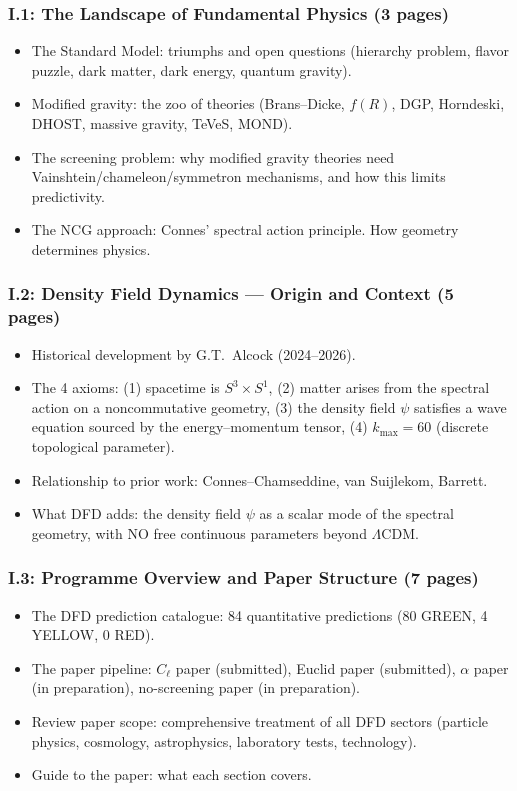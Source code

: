 \documentclass[11pt,a4paper]{article}
\begin{document}
\subsubsection{I.1: The Landscape of Fundamental Physics (3 pages)}
\begin{itemize}
\item The Standard Model: triumphs and open questions (hierarchy problem, flavor puzzle, dark matter, dark energy, quantum gravity).
\item Modified gravity: the zoo of theories (Brans--Dicke, $f(R)$, DGP, Horndeski, DHOST, massive gravity, TeVeS, MOND).
\item The screening problem: why modified gravity theories need Vainshtein/chameleon/symmetron mechanisms, and how this limits predictivity.
\item The NCG approach: Connes' spectral action principle. How geometry determines physics.
\end{itemize}

\subsubsection{I.2: Density Field Dynamics --- Origin and Context (5 pages)}
\begin{itemize}
\item Historical development by G.T.\ Alcock (2024--2026).
\item The 4 axioms: (1) spacetime is $S^3 \times S^1$, (2) matter arises from the spectral action on a noncommutative geometry, (3) the density field $\psi$ satisfies a wave equation sourced by the energy--momentum tensor, (4) $k_{\max} = 60$ (discrete topological parameter).
\item Relationship to prior work: Connes--Chamseddine, van Suijlekom, Barrett.
\item What DFD adds: the density field $\psi$ as a scalar mode of the spectral geometry, with NO free continuous parameters beyond $\Lambda$CDM.
\end{itemize}

\subsubsection{I.3: Programme Overview and Paper Structure (7 pages)}
\begin{itemize}
\item The DFD prediction catalogue: 84 quantitative predictions (80 GREEN, 4 YELLOW, 0 RED).
\item The paper pipeline: $C_\ell$ paper (submitted), Euclid paper (submitted), $\alpha$ paper (in preparation), no-screening paper (in preparation).
\item Review paper scope: comprehensive treatment of all DFD sectors (particle physics, cosmology, astrophysics, laboratory tests, technology).
\item Guide to the paper: what each section covers.
\end{itemize}
\end{document}
